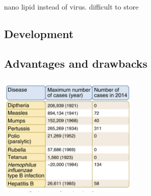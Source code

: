 \documentclass{article}
\begin{document}

                nano lipid instead of virus.
                difficult to store

        \subsection{Development}





        \subsection{Advantages and drawbacks}

        
        \begin{center}
            \includegraphics[width=0.5\textwidth]{imgs/NumberOfCases.JPG}
        \end{center}


\end{document}
